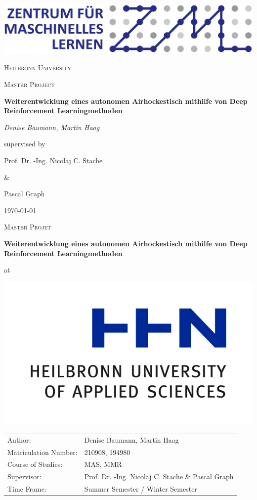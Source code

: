 \begin{titlepage}
	\centering
	\includegraphics[width=1\textwidth]{images/zml_logo}\par\vspace{1cm}
	{\scshape\LARGE Heilbronn University \par}
	\vspace{1cm}
	{\scshape\Large Master Project\par}
	\vspace{1.5cm}
	{\huge\bfseries Weiterentwicklung eines autonomen Airhockestisch mithilfe von Deep Reinforcement Learningmethoden\par}
	\vspace{1.5cm}
	{\Large\itshape Denise Baumann, Martin Haag\par}
	\vfill
	supervised by\par
	\vspace{0.2cm}
	Prof. Dr. -Ing. Nicolaj C. Stache \par \& \par Pascal Graph
	\vfill
	{\large \today\par}
\end{titlepage}

\thispagestyle{title_page}
\vspace*{2cm}
\begin{center}
{\scshape\LARGE Master Projet \par}
\vspace{1cm}
{\huge\bfseries Weiterentwicklung eines autonomen Airhockestisch mithilfe von Deep Reinforcement Learningmethoden\par}
\vspace{1.5cm}
{\large at \par}
\vspace {1cm}
\includegraphics[width=0.6\linewidth]{images/HHNLogo}
\end{center}
\vfill
\null
\begin{tabular}{l l}
Author: & Denise Baumann, Martin Haag\\
Matriculation Number: & 210908, 194980\\
Course of Studies: & MAS, MMR\\
Supervisor: & Prof. Dr. -Ing. Nicolaj C. Stache \& Pascal Graph \\
Time Frame: & Summer Semester / Winter Semester 
\end{tabular}



